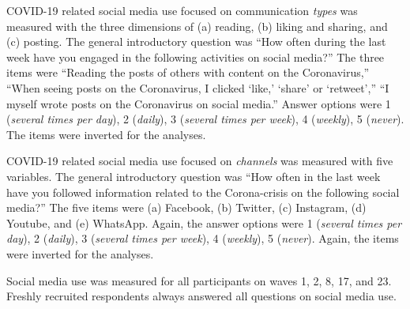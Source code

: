 \documentclass[
  english,
  man,mask,floatsintext]{apa6}
\begin{document}
COVID-19 related social media use focused on communication \emph{types} was measured with the three dimensions of (a) reading, (b) liking and sharing, and (c) posting.
The general introductory question was ``How often during the last week have you engaged in the following activities on social media?''
The three items were ``Reading the posts of others with content on the Coronavirus,'' ``When seeing posts on the Coronavirus, I clicked `like,' `share' or `retweet','' ``I myself wrote posts on the Coronavirus on social media.''
Answer options were 1 (\emph{several times per day}), 2 (\emph{daily}), 3 (\emph{several times per week}), 4 (\emph{weekly}), 5 (\emph{never}).
The items were inverted for the analyses.

COVID-19 related social media use focused on \emph{channels} was measured with five variables.
The general introductory question was ``How often in the last week have you followed information related to the Corona-crisis on the following social media?''
The five items were (a) Facebook, (b) Twitter, (c) Instagram, (d) Youtube, and (e) WhatsApp.
Again, the answer options were 1 (\emph{several times per day}), 2 (\emph{daily}), 3 (\emph{several times per week}), 4 (\emph{weekly}), 5 (\emph{never}).
Again, the items were inverted for the analyses.

Social media use was measured for all participants on waves 1, 2, 8, 17, and 23.
Freshly recruited respondents always answered all questions on social media use.
\end{document}

